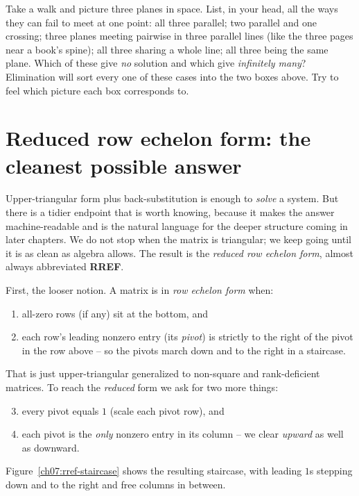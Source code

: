 \begin{walkbox}
Take a walk and picture three planes in space. List, in your head, all the ways
they can fail to meet at one point: all three parallel; two parallel and one
crossing; three planes meeting pairwise in three parallel lines (like the three
pages near a book's spine); all three sharing a whole line; all three being the
same plane. Which of these give \emph{no} solution and which give
\emph{infinitely many}? Elimination will sort every one of these cases into the
two boxes above. Try to feel which picture each box corresponds to.
\end{walkbox}

\section{Reduced row echelon form: the cleanest possible answer}

Upper-triangular form plus back-substitution is enough to \emph{solve} a system.
But there is a tidier endpoint that is worth knowing, because it makes the answer
machine-readable and is the natural language for the deeper structure coming in
later chapters. We do not stop when the matrix is triangular; we keep going until
it is as clean as algebra allows. The result is the \emph{reduced row echelon
form}, almost always abbreviated \textbf{RREF}.

First, the looser notion. A matrix is in \emph{row echelon form} when:
\begin{enumerate}
  \item all-zero rows (if any) sit at the bottom, and
  \item each row's leading nonzero entry (its \emph{pivot}) is strictly to the
  right of the pivot in the row above -- so the pivots march down and to the
  right in a staircase.
\end{enumerate}
That is just upper-triangular generalized to non-square and rank-deficient
matrices. To reach the \emph{reduced} form we ask for two more things:
\begin{enumerate}
  \setcounter{enumi}{2}
  \item every pivot equals $1$ (scale each pivot row), and
  \item each pivot is the \emph{only} nonzero entry in its column -- we clear
  \emph{upward} as well as downward.
\end{enumerate}
Figure~\ref{ch07:rref-staircase} shows the resulting staircase, with leading
$1$s stepping down and to the right and free columns in between.

